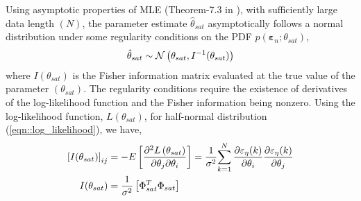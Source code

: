 
Using asymptotic properties of MLE (Theorem-7.3 in \cite{kay1993estimation}), with sufficiently large data length
$(N)$, the parameter estimate $\hat \theta_{sat}$ asymptotically follows a normal distribution under some regularity
conditions on the PDF $p(\pmb \varepsilon_n; \theta_{sat})$,
\begin{align}
        \hat \theta_{sat} \sim \mathcal{N} \left( \theta_{sat},  I^{-1}(\theta_{sat}) \right)
        \label{eqn::theta_dist}
\end{align}
where $I(\theta_{sat})$ is the Fisher information matrix evaluated at the true value of the parameter $(\theta_{sat})$.
The regularity conditions require the existence of derivatives of the log-likelihood function and the Fisher information
being nonzero. Using the log-likelihood function, $L(\theta_{sat})$, for half-normal distribution
(\ref{eqn::log_likelihood}), we have,
\begin{align}
        \left[ I(\theta_{sat}) \right]_{ij} & = -E \left[ \frac{\partial^2 L\left( \theta_{sat} \right)}{\partial \theta_j
        \partial \theta_i} \right] = \frac{1}{\sigma^2} {\sum_{k=1}^{N} \frac{\partial \varepsilon_\eta(k)}{\partial \theta_i}\frac{\partial \varepsilon_\eta(k)}{\partial \theta_j}} \notag \\
        I(\theta_{sat})            & = \frac{1}{\sigma^2} \left[ \Phi_{sat}^T \Phi_{sat} \right]
        \label{eqn::fisher_information}
\end{align}

